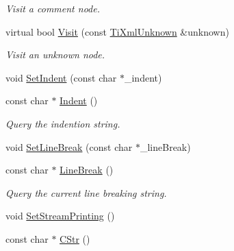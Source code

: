 \begin{DoxyCompactItemize}
\begin{DoxyCompactList}\small\item\em Visit a comment node. \end{DoxyCompactList}\item 
\hypertarget{class_ti_xml_printer_ad2dca6dd106e8982fd3c7db1f3330970}{virtual bool \hyperlink{class_ti_xml_printer_ad2dca6dd106e8982fd3c7db1f3330970}{Visit} (const \hyperlink{class_ti_xml_unknown}{Ti\+Xml\+Unknown} \&unknown)}\label{class_ti_xml_printer_ad2dca6dd106e8982fd3c7db1f3330970}

\begin{DoxyCompactList}\small\item\em Visit an unknown node. \end{DoxyCompactList}\item 
void \hyperlink{class_ti_xml_printer_a213377a4070c7e625bae59716b089e5e}{Set\+Indent} (const char $\ast$\+\_\+indent)
\item 
\hypertarget{class_ti_xml_printer_abb33ec7d4bad6aaeb57f4304394b133d}{const char $\ast$ \hyperlink{class_ti_xml_printer_abb33ec7d4bad6aaeb57f4304394b133d}{Indent} ()}\label{class_ti_xml_printer_abb33ec7d4bad6aaeb57f4304394b133d}

\begin{DoxyCompactList}\small\item\em Query the indention string. \end{DoxyCompactList}\item 
void \hyperlink{class_ti_xml_printer_a4be1e37e69e3858c59635aa947174fe6}{Set\+Line\+Break} (const char $\ast$\+\_\+line\+Break)
\item 
\hypertarget{class_ti_xml_printer_a11f1b4804a460b175ec244eb5724d96d}{const char $\ast$ \hyperlink{class_ti_xml_printer_a11f1b4804a460b175ec244eb5724d96d}{Line\+Break} ()}\label{class_ti_xml_printer_a11f1b4804a460b175ec244eb5724d96d}

\begin{DoxyCompactList}\small\item\em Query the current line breaking string. \end{DoxyCompactList}\item 
void \hyperlink{class_ti_xml_printer_ab23a90629e374cb1cadca090468bbd19}{Set\+Stream\+Printing} ()
\item 
\hypertarget{class_ti_xml_printer_a859eede9597d3e0355b77757be48735e}{const char $\ast$ \hyperlink{class_ti_xml_printer_a859eede9597d3e0355b77757be48735e}{C\+Str} ()}\label{class_ti_xml_printer_a859eede9597d3e0355b77757be48735e}


\end{DoxyCompactItemize}
